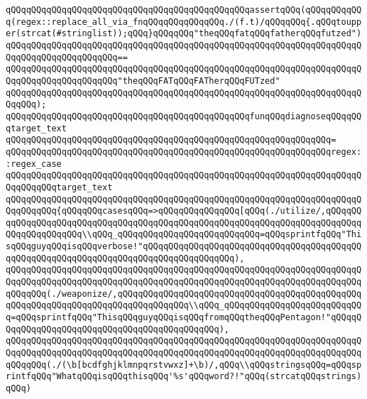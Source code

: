 \newline
\verb|qQQqqQQqqQQqqQQqqQQqqQQqqQQqqQQqqQQqqQQqqQQqqQQqassertqQQq(qQQqqQQqqQQq(regex::replace_all_via_fnqQQqqQQqqQQqqQQq./(f.t)/qQQqqQQq{.qQQqtoupper(strcat(#stringlist));qQQq}qQQqqQQq"theqQQqfatqQQqfatherqQQqfutzed")|\newline
\verb|qQQqqQQqqQQqqQQqqQQqqQQqqQQqqQQqqQQqqQQqqQQqqQQqqQQqqQQqqQQqqQQqqQQqqQQqqQQqqQQqqQQqqQQqqQQq==|\newline
\verb|qQQqqQQqqQQqqQQqqQQqqQQqqQQqqQQqqQQqqQQqqQQqqQQqqQQqqQQqqQQqqQQqqQQqqQQqqQQqqQQqqQQqqQQqqQQq"theqQQqFATqQQqFATherqQQqFUTzed"|\newline
\verb|qQQqqQQqqQQqqQQqqQQqqQQqqQQqqQQqqQQqqQQqqQQqqQQqqQQqqQQqqQQqqQQqqQQqqQQqqQQq);|\newline
\newline
\newline
\verb|qQQqqQQqqQQqqQQqqQQqqQQqqQQqqQQqqQQqqQQqqQQqqQQqfunqQQqdiagnoseqQQqqQQqtarget_text|\newline
\verb|qQQqqQQqqQQqqQQqqQQqqQQqqQQqqQQqqQQqqQQqqQQqqQQqqQQqqQQqqQQqqQQq=|\newline
\verb|qQQqqQQqqQQqqQQqqQQqqQQqqQQqqQQqqQQqqQQqqQQqqQQqqQQqqQQqqQQqqQQqregex::regex_case|\newline
\verb|qQQqqQQqqQQqqQQqqQQqqQQqqQQqqQQqqQQqqQQqqQQqqQQqqQQqqQQqqQQqqQQqqQQqqQQqqQQqqQQqtarget_text|\newline
\verb|qQQqqQQqqQQqqQQqqQQqqQQqqQQqqQQqqQQqqQQqqQQqqQQqqQQqqQQqqQQqqQQqqQQqqQQqqQQqqQQq{qQQqqQQqcasesqQQq=>qQQqqQQqqQQqqQQq[qQQq(./utilize/,qQQqqQQqqQQqqQQqqQQqqQQqqQQqqQQqqQQqqQQqqQQqqQQqqQQqqQQqqQQqqQQqqQQqqQQqqQQqqQQqqQQqqQQqqQQq\\qQQq_qQQqqQQqqQQqqQQqqQQqqQQqqQQq=qQQqsprintfqQQq"ThisqQQqguyqQQqisqQQqverbose!"qQQqqQQqqQQqqQQqqQQqqQQqqQQqqQQqqQQqqQQqqQQqqQQqqQQqqQQqqQQqqQQqqQQqqQQqqQQqqQQqqQQqqQQq),|\newline
\verb|qQQqqQQqqQQqqQQqqQQqqQQqqQQqqQQqqQQqqQQqqQQqqQQqqQQqqQQqqQQqqQQqqQQqqQQqqQQqqQQqqQQqqQQqqQQqqQQqqQQqqQQqqQQqqQQqqQQqqQQqqQQqqQQqqQQqqQQqqQQqqQQqqQQq(./weaponize/,qQQqqQQqqQQqqQQqqQQqqQQqqQQqqQQqqQQqqQQqqQQqqQQqqQQqqQQqqQQqqQQqqQQqqQQqqQQqqQQqqQQq\\qQQq_qQQqqQQqqQQqqQQqqQQqqQQqqQQq=qQQqsprintfqQQq"ThisqQQqguyqQQqisqQQqfromqQQqtheqQQqPentagon!"qQQqqQQqqQQqqQQqqQQqqQQqqQQqqQQqqQQqqQQqqQQqqQQq),|\newline
\verb|qQQqqQQqqQQqqQQqqQQqqQQqqQQqqQQqqQQqqQQqqQQqqQQqqQQqqQQqqQQqqQQqqQQqqQQqqQQqqQQqqQQqqQQqqQQqqQQqqQQqqQQqqQQqqQQqqQQqqQQqqQQqqQQqqQQqqQQqqQQqqQQqqQQq(./(\b[bcdfghjklmnpqrstvwxz]+\b)/,qQQq\\qQQqstringsqQQq=qQQqsprintfqQQq"WhatqQQqisqQQqthisqQQq'%s'qQQqword?!"qQQq(strcatqQQqstrings)qQQq)|\newline
